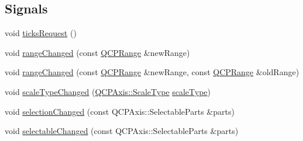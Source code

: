 \subsection*{Signals}
\begin{DoxyCompactItemize}
\item 
void \hyperlink{classQCPAxis_af46d99613d29518795134ec4928e3873}{ticks\+Request} ()
\item 
void \hyperlink{classQCPAxis_a0894084e4c16a1736534c4095746f910}{range\+Changed} (const \hyperlink{classQCPRange}{Q\+C\+P\+Range} \&new\+Range)
\item 
void \hyperlink{classQCPAxis_aac8576288e8e31f16186124bc10dd10d}{range\+Changed} (const \hyperlink{classQCPRange}{Q\+C\+P\+Range} \&new\+Range, const \hyperlink{classQCPRange}{Q\+C\+P\+Range} \&old\+Range)
\item 
void \hyperlink{classQCPAxis_a3505ed8a93bd2e349d858d84996bf767}{scale\+Type\+Changed} (\hyperlink{classQCPAxis_a36d8e8658dbaa179bf2aeb973db2d6f0}{Q\+C\+P\+Axis\+::\+Scale\+Type} \hyperlink{classQCPAxis_a8563e13407bc0616da7f7c84e02de170}{scale\+Type})
\item 
void \hyperlink{classQCPAxis_a62b598abeee7174a05f9d542cc85b1f5}{selection\+Changed} (const Q\+C\+P\+Axis\+::\+Selectable\+Parts \&parts)
\item 
void \hyperlink{classQCPAxis_aa5ff1fd851139028a3bb4efcb31de9fc}{selectable\+Changed} (const Q\+C\+P\+Axis\+::\+Selectable\+Parts \&parts)
\end{DoxyCompactItemize}
